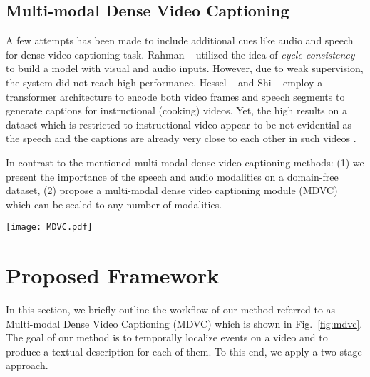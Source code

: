 \documentclass[10pt,twocolumn,letterpaper]{article}
\newcommand\hiddenref[1]{\sbox0{\ref{#1}}}
\begin{document}
\subsection{Multi-modal Dense Video Captioning}

A few attempts has been made to include additional cues like audio and speech \cite{Rahman2019,ACase_Hessel_2019,DenseProcCap_Shi_2019} for dense video captioning task. Rahman \etal~\cite{Rahman2019} utilized the idea of \textit{cycle-consistency} \cite{Xuguang2018} to build a model with visual and audio inputs. However, due to weak supervision, the system did not reach high performance. Hessel \etal~\cite{ACase_Hessel_2019} and Shi \etal~\cite{DenseProcCap_Shi_2019} employ a transformer architecture \cite{Vaswani2017} to encode both video frames and speech segments to generate captions for instructional (cooking) videos. Yet, the high results on a dataset which is restricted to instructional video appear to be not evidential as the speech and the captions are already very close to each other in such videos \cite{Miech2019}. 

In contrast to the mentioned multi-modal dense video captioning methods: (1) we present the importance of the speech and audio modalities on a domain-free dataset, (2) propose a multi-modal dense video captioning module (MDVC) which can be scaled to any number of modalities. \hiddenref{fig:mdvc} \hiddenref{fig:transformer}

\begin{figure*}[t!]
    \begin{center}
\texttt{[image: MDVC.pdf]}
    \end{center}
    \caption{The proposed Multi-modal Dense Video Captioning (MDVC) framework. Given an input consisting of several modalities, namely, audio, speech, and visual, internal representations are produced by a corresponding feature transformer (middle). Then, the features are fused in the multi-modal generator (right) that outputs the distribution over the vocabulary.\label{fig:mdvc}}
\end{figure*}


\section{Proposed Framework}
In this section, we briefly outline the workflow of our method referred to as Multi-modal Dense Video Captioning (MDVC) which is shown in Fig.~\ref{fig:mdvc}. The goal of our method is to temporally localize events on a video and to produce a textual description for each of them. To this end, we apply a two-stage approach. 
\end{document}
